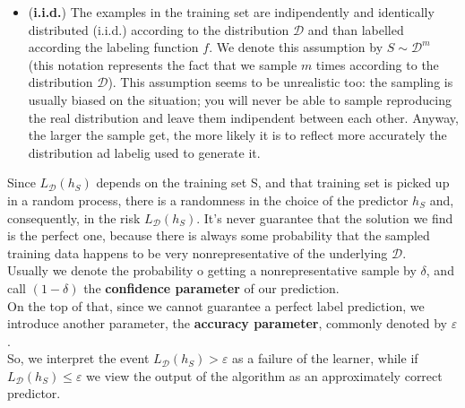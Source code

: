 \documentclass[12pt]{report}
\theoremstyle{plain}
\newcommand\mcl[1]{\mathcal{#1}}
\begin{document}
\begin{flushleft}
\begin{itemize}
\item (\textbf{i.i.d.}) The examples in the training set are indipendently and identically distributed (i.i.d.) according to the distribution $\mcl{D}$ and than labelled according the labeling function $f$. We denote this assumption by $S\sim\mcl{D}^m$ (this notation represents the fact that we sample $m$ times according to the distribution $\mcl{D}$). This assumption seems to be unrealistic too: the sampling is usually biased on the situation; you will never be able to sample reproducing the real distribution and leave them indipendent between each other. Anyway, the larger the sample get, the more likely it is to reflect more accurately the distribution ad labelig used to generate it.
\end{itemize}
Since $L_\mcl{D}(h_S)$ depends on the training set S, and that training set is picked up in a random process, there is a randomness in the choice of the predictor $h_S$ and, consequently, in the risk $L_\mcl{D}(h_S)$. It's never guarantee that the solution we find is the perfect one, because there is always some probability that the sampled training data happens to be very nonrepresentative of the underlying $\mcl{D}$.\\
Usually we denote the probability o getting a nonrepresentative sample by $\delta$, and call $(1-\delta)$ the \textbf{confidence parameter} of our prediction.\\
On the top of that, since we cannot guarantee a perfect label prediction, we introduce another parameter, the \textbf{accuracy parameter}, commonly denoted by $\varepsilon$.\\
So, we interpret the event $L_\mcl{D}(h_S)>\varepsilon$ as a failure of the learner, while if $L_\mcl{D}(h_S)\leq\varepsilon$ we view the output of the algorithm as an approximately correct predictor.\\


\end{flushleft}
\end{document}

